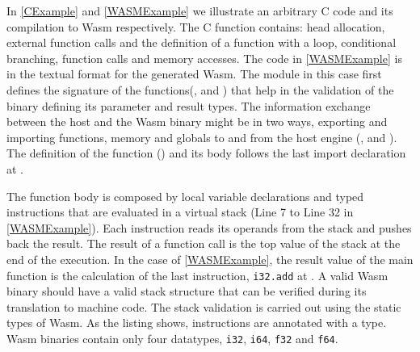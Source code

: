 In \autoref{CExample} and \autoref{WASMExample} we illustrate an arbitrary C code and its compilation to Wasm respectively. The C function contains: head allocation, external function calls and the definition of a function with a loop, conditional branching, function calls and memory accesses. The code in \autoref{WASMExample} is in the textual format for the generated Wasm. The module in this case first defines the signature of the functions(,   and  )  that help in the validation of the binary defining its parameter and result types. The information exchange between the host and the Wasm binary might be in two ways, exporting and importing functions, memory and globals to and from the host engine (,  and ). The definition of the function () and its body follows the last import declaration at . 

The function body is composed by local variable declarations and typed instructions that are evaluated in a virtual stack (Line 7 to Line 32 in \autoref{WASMExample}). Each instruction reads its operands from the stack and pushes back the result. The result of a function call is the top value of the stack at the end of the execution. In the case of \autoref{WASMExample}, the result value of the main function is the calculation of the last instruction, \texttt{i32.add} at . A valid Wasm binary should have a valid stack structure that can be verified during its translation to machine code. The stack validation is carried out using the static types of Wasm. 
As the listing shows, instructions are annotated with a type. Wasm binaries contain only four datatypes, \texttt{i32}, \texttt{i64}, \texttt{f32} and \texttt{f64}.


